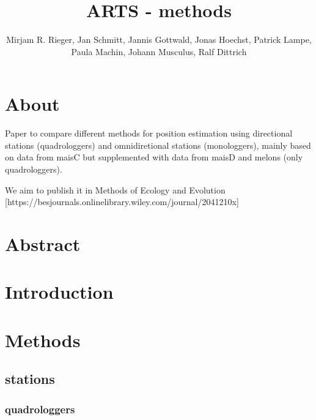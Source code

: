 \documentclass[
  letterpaper,
  DIV=11,
  numbers=noendperiod]{scrartcl}
\title{ARTS - methods}
\author{Mirjam R. Rieger, Jan Schmitt, Jannis Gottwald, Jonas Hoechst,
Patrick Lampe, Paula Machin, Johann Musculus, Ralf Dittrich}
\date{}
\renewcommand*\contentsname{Table of contents}
\newcommand\contentsname{Table of contents}
\begin{document}
\maketitle
\ifdefined\Shaded\renewenvironment{Shaded}{\begin{tcolorbox}[sharp corners, borderline west={3pt}{0pt}{shadecolor}, frame hidden, interior hidden, boxrule=0pt, breakable, enhanced]}{\end{tcolorbox}}\fi

\renewcommand*\contentsname{Table of contents}
{
\hypersetup{linkcolor=}
\setcounter{tocdepth}{2}
\tableofcontents
}
\hypertarget{about}{%
\section*{About}\label{about}}

Paper to compare different methods for position estimation using
directional stations (quadrologgers) and omnidiretional stations
(monologgers), mainly based on data from maisC but supplemented with
data from maisD and melons (only quadrologgers).

We aim to publish it in Methods of Ecology and Evolution
{[}https://besjournals.onlinelibrary.wiley.com/journal/2041210x{]}

\hypertarget{abstract}{%
\section*{Abstract}\label{abstract}}

\hypertarget{introduction}{%
\section{Introduction}\label{introduction}}

\hypertarget{methods}{%
\section{Methods}\label{methods}}

\hypertarget{stations}{%
\subsection{stations}\label{stations}}

\hypertarget{quadrologgers}{%
\subsubsection{quadrologgers}\label{quadrologgers}}
\end{document}
